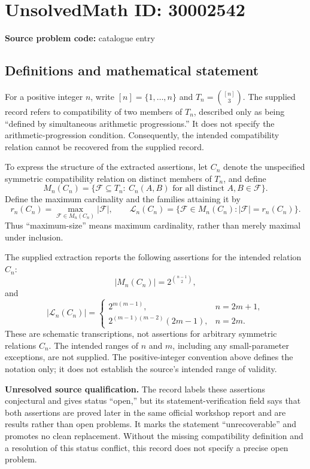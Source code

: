 \documentclass[11pt]{article}
\begin{document}
\section*{UnsolvedMath ID: 30002542}
\textbf{Source problem code:} catalogue entry
\subsection{Definitions and mathematical statement}
For a positive integer \(n\), write \([n]=\{1,\ldots,n\}\) and \(T_n=\binom{[n]}{3}\). The supplied record refers to compatibility of two members of \(T_n\), described only as being ``defined by simultaneous arithmetic progressions.'' It does not specify the arithmetic-progression condition. Consequently, the intended compatibility relation cannot be recovered from the supplied record.

To express the structure of the extracted assertions, let \(C_n\) denote the unspecified symmetric compatibility relation on distinct members of \(T_n\), and define
\[
M_n(C_n)=\bigl\{\mathcal F\subseteq T_n:\ C_n(A,B)\text{ for all distinct }A,B\in\mathcal F\bigr\}.
\]
Define the maximum cardinality and the families attaining it by
\[
r_n(C_n)=\max_{\mathcal F\in M_n(C_n)}|\mathcal F|,
\qquad
\mathcal L_n(C_n)=\{\mathcal F\in M_n(C_n):|\mathcal F|=r_n(C_n)\}.
\]
Thus ``maximum-size'' means maximum cardinality, rather than merely maximal under inclusion.

The supplied extraction reports the following assertions for the intended relation \(C_n\):
\[
|M_n(C_n)|=2^{\binom{n-1}{2}},
\]
and
\[
|\mathcal L_n(C_n)|=
\begin{cases}
2^{m(m-1)},&n=2m+1,\\
2^{(m-1)(m-2)}(2m-1),&n=2m.
\end{cases}
\]
These are schematic transcriptions, not assertions for arbitrary symmetric relations \(C_n\). The intended ranges of \(n\) and \(m\), including any small-parameter exceptions, are not supplied. The positive-integer convention above defines the notation only; it does not establish the source's intended range of validity.

\textbf{Unresolved source qualification.} The record labels these assertions conjectural and gives status ``open,'' but its statement-verification field says that both assertions are proved later in the same official workshop report and are results rather than open problems. It marks the statement ``unrecoverable'' and promotes no clean replacement. Without the missing compatibility definition and a resolution of this status conflict, this record does not specify a precise open problem.
\end{document}
